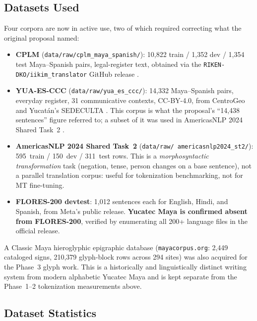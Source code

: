 \documentclass[11pt]{article}
\begin{document}
\subsection{Datasets Used}
\label{sec:data}

Four corpora are now in active use, two of which required correcting what the
original proposal named:

\begin{itemize}
  \item \textbf{CPLM} (\texttt{data/raw/cplm\_maya\_spanish/}): 10,822 train /
        1,352 dev / 1,354 test Maya--Spanish pairs, legal-register text,
        obtained via the \texttt{RIKEN-DKO/iikim\_translator} GitHub release
        \cite{rangel2024cplm}.
  \item \textbf{YUA-ES-CCC} (\texttt{data/raw/yua\_es\_ccc/}): 14,332
        Maya--Spanish pairs, everyday register, 31 communicative contexts,
        CC-BY-4.0, from CentroGeo and Yucat\'an's SEDECULTA
        \cite{alemol2026}. This corpus is what the proposal's ``14,438
        sentences'' figure referred to; a subset of it was used in
        AmericasNLP 2024 Shared Task~2 \cite{americasnlp2024st2}.
  \item \textbf{AmericasNLP 2024 Shared Task~2} (\texttt{data/raw/
        americasnlp2024\_st2/}): 595~train / 150~dev / 311~test rows. This is a
        \emph{morphosyntactic transformation} task (negation, tense, person
        changes on a base sentence), not a parallel translation corpus:
        useful for tokenization benchmarking, not for MT fine-tuning.
  \item \textbf{FLORES-200 devtest}: 1,012 sentences each for English, Hindi,
        and Spanish, from Meta's public release. \textbf{Yucatec Maya is
        confirmed absent from FLORES-200}, verified by enumerating all
        200+ language files in the official release.
\end{itemize}

A Classic Maya hieroglyphic epigraphic database (\texttt{mayacorpus.org}:
2,449 cataloged signs, 210,379 glyph-block rows across 294 sites) was also
acquired for the Phase~3 glyph work. This is a historically and
linguistically distinct writing system from modern alphabetic Yucatec Maya and
is kept separate from the Phase~1--2 tokenization measurements above.

\subsection{Dataset Statistics}
\end{document}
